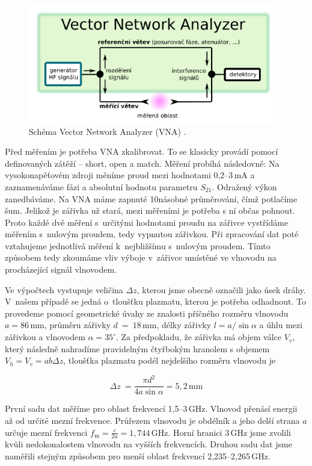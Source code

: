 \documentclass[a4paper,12pt]{article}
\begin{document}
\begin{figure}[h]
	\centering
	\includegraphics[width=110mm]{vna.png}
	\caption{Schéma Vector Network Analyzer (VNA) \cite{navod}.}
	\label{vna}
\end{figure}

Před měřením je potřeba VNA zkalibrovat. To se klasicky provádí pomocí definovaných
zátěží -- short, open a match. Měření probíhá následovně: Na vysokonapěťovém zdroji
měníme proud mezi hodnotami 0,2--3\,\si{\milli\ampere} a zaznamenáváme fázi a 
absolutní hodnotu parametru $S_{21}$. Odražený výkon zanedbáváme. Na VNA máme 
zapnuté 10násobné průměrování, 
čímž 
potlačíme
šum. Jelikož je zářivka už stará, mezi měřeními je potřeba s ní občas pohnout. 
Proto každé dvě měření s~určitými hodnotami proudu na zářivce vystřídáme měřením
s~nulovým proudem, tedy vypnutou zářivkou. Při zpracování dat poté vztahujeme jednotlivá
měření k~nejbližšímu s~nulovým proudem. Tímto způsobem tedy zkoumáme vliv výboje v~zářivce umístěné ve vlnovodu na procházející signál vlnovodem.

Ve výpočtech vystupuje veličina $\Delta z$, kterou jsme obecně označili jako 
úsek dráhy.
V~našem případě se jedná o~tloušťku plazmatu, kterou je potřeba odhadnout. To provedeme
pomocí geometrické úvahy ze znalosti příčného rozměru vlnovodu $a = 
86$\,\si{\milli\meter},
průměru zářivky $d$~=~$18$\,\si{\milli\meter}, délky zářivky $l = a/\sin\alpha$ 
a úhlu mezi 
zářivkou a vlnovodem 
$\alpha = 35^{\circ}$. Za
předpokladu, že zářivka má objem válce $V_v$, který následně nahradíme 
pravidelným
čtyř\-bo\-kým hranolem s objemem $V_h = V_v =ab\Delta z$, tloušťka plazmatu 
podél 
nejdelšího rozměru vlnovodu je

\begin{equation}
	\Delta z~= \frac{\pi d^2}{4a\sin\alpha} = 5,2\,\si{\milli\meter}
\end{equation}

První sadu dat měříme pro oblast frekvencí 1,5--3\,\si{\giga\hertz}. 
Vlnovod přenásí energii až od určité mezní frekvence. Průřezem vlnovodu je 
obdélník a jeho delší strana $a$ určuje mezní frekvenci $f_{\text{m}} = 
\frac{c}{2a} = 1,744\,\si{\giga\hertz}$. Horní hranici 3\,\si{\giga\hertz} jsme 
zvolili kvůli nedokonalostem vlnovodu na vyšších frekvencích. Druhou sadu dat 
jsme naměřili stejným způsobem pro menší oblast frekvencí 
2,235--2,265\,\si{\giga\hertz}.
\end{document}
